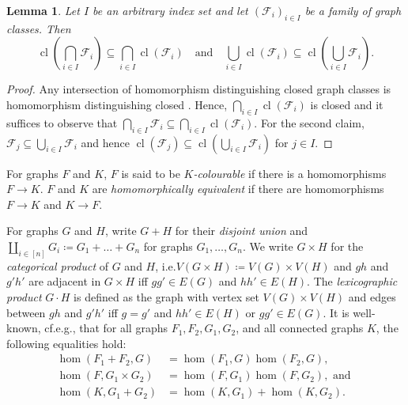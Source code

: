 \documentclass[3p,final]{elsarticle}
\DeclareMathOperator{\cl}{cl}
\newtheorem{lemma}[theorem]{Lemma}
\begin{document}
	\begin{lemma} \label{lem:intersection}
		Let $I$ be an arbitrary index set and let $(\mathcal{F}_i)_{i \in I}$ be a family of graph classes.
		Then 
		\[
			\cl\left(\bigcap_{i\in I} \mathcal{F}_i \right) \subseteq \bigcap_{i \in I} \cl(\mathcal{F}_i) \quad \text{and} \quad
			\bigcup_{i\in I} \cl(\mathcal{F}_i) \subseteq \cl\left( \bigcup_{i\in I} \mathcal{F}_i \right).
		\]
	\end{lemma}
	\begin{proof}
		Any intersection of homomorphism distinguishing closed graph classes is homomorphism distinguishing closed \cite[Lemma~6.1]{roberson_oddomorphisms_2022}. Hence, $\bigcap_{i \in I} \cl(\mathcal{F}_i)$ is closed and it suffices to observe that $\bigcap_{i \in I} \mathcal{F}_i \subseteq \bigcap_{i \in I} \cl(\mathcal{F}_i)$.
		For the second claim, $\mathcal{F}_j \subseteq \bigcup_{i\in I} \mathcal{F}_i$ and hence $\cl(\mathcal{F}_j) \subseteq \cl(\bigcup_{i\in I} \mathcal{F}_i)$ for $j\in I$.
	\end{proof}
	
	For graphs $F$ and $K$, $F$ is said to be \emph{$K$-colourable} if there is a homomorphisms $F \to K$. $F$ and $K$ are \emph{homomorphically equivalent} if there are homomorphisms $F \to K$ and $K \to F$.
	

	For graphs $G$ and $H$, write $G + H$ for their \emph{disjoint union} and $\coprod_{i \in [n]} G_i \coloneqq G_1 + \dots + G_n$ for graphs $G_1, \dots, G_n$.
	We write $G \times H$ for the \emph{categorical product} of $G$ and $H$, i.e.\@ $V(G \times H) \coloneqq V(G) \times V(H)$ and $gh$ and $g'h'$ are adjacent in $G \times H$ iff $gg' \in E(G)$ and $hh' \in E(H)$. The \emph{lexicographic product} $G \cdot H$ is defined as the graph with vertex set $V(G) \times V(H)$ and edges between $gh$ and $g'h'$ iff $g = g'$ and $hh' \in E(H)$ or $gg' \in E(G)$.
	It is well-known, cf.\@ e.g.\@ \cite[(5.28)--(5.30)]{lovasz_large_2012}, that
	for all graphs $F_1, F_2, G_1, G_2$, and all connected graphs $K$, the following equalities hold:
	\begin{align}
		\hom(F_1 + F_2, G) &= \hom(F_1, G) \hom(F_2, G), \label{eq:coproduct} \\
		\hom(F, G_1 \times G_2) &= \hom(F, G_1) \hom(F, G_2), \text{ and }\label{eq:product} \\
		\hom(K, G_1 + G_2) &= \hom(K, G_1) + \hom(K, G_2). \label{eq:disjoint}
	\end{align}
\end{document}
